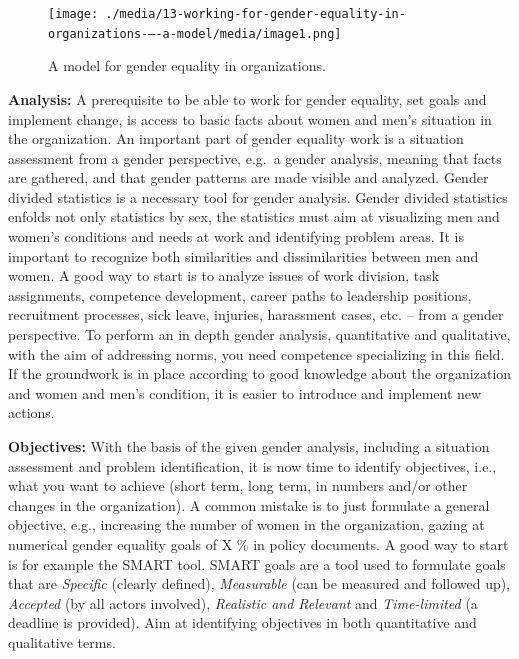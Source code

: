 \documentclass[
  12pt,
]{scrbook}
\begin{document}
\begin{figure}
\hypertarget{fig:figure121}{%
\centering
\texttt{[image: ./media/13-working-for-gender-equality-in-organizations-–-a-model/media/image1.png]}
\caption{A model for gender equality in organizations.}\label{fig:figure121}
}
\end{figure}

\textbf{Analysis:} A prerequisite to be able to work for gender equality, set goals and implement change, is access to basic facts about women and men's situation in the organization. An important part of gender equality work is a situation assessment from a gender perspective, e.g.~a gender analysis, meaning that facts are gathered, and that gender patterns are made visible and analyzed. Gender divided statistics is a necessary tool for gender analysis. Gender divided statistics enfolds not only statistics by sex, the statistics must aim at visualizing men and women's conditions and needs at work and identifying problem areas. It is important to recognize both similarities and dissimilarities between men and women. A good way to start is to analyze issues of work division, task assignments, competence development, career paths to leadership positions, recruitment processes, sick leave, injuries, harassment cases, etc. -- from a gender perspective. To perform an in depth gender analysis, quantitative and qualitative, with the aim of addressing norms, you need competence specializing in this field. If the groundwork is in place according to good knowledge about the organization and women and men's condition, it is easier to introduce and implement new actions.

\textbf{Objectives:} With the basis of the given gender analysis, including a situation assessment and problem identification, it is now time to identify objectives, i.e., what you want to achieve (short term, long term, in numbers and/or other changes in the organization). A common mistake is to just formulate a general objective, e.g., increasing the number of women in the organization, gazing at numerical gender equality goals of X \% in policy documents. A good way to start is for example the SMART tool. SMART goals are a tool used to formulate goals that are \emph{Specific} (clearly defined), \emph{Measurable} (can be measured and followed up), \emph{Accepted} (by all actors involved), \emph{Realistic and Relevant} and \emph{Time-limited} (a deadline is provided). Aim at identifying objectives in both quantitative and qualitative terms.
\end{document}
